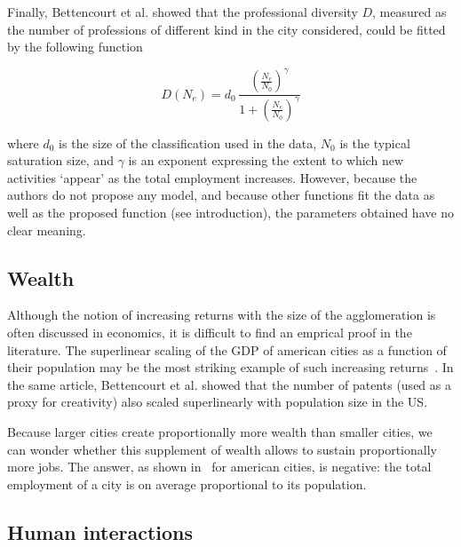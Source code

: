 Finally, Bettencourt et al.\cite{Bettencourt:2014} showed that the professional
diversity $D$, measured as the number of professions of different kind in the
city considered, could be fitted by the following function

\begin{equation}
    D(N_e) = d_0\, \frac{\left(\frac{N_e}{N_0}\right)^\gamma}{1+\left(\frac{N_e}{N_0}\right)^\gamma}
\end{equation}

where $d_0$ is the size of the classification used in the data, $N_0$ is the
typical saturation size, and $\gamma$ is an exponent expressing the extent to
which new activities `appear' as the total employment increases. However,
because the authors do not propose any model, and because other functions fit
the data as well as the proposed function (see introduction), the parameters
obtained have no clear meaning.

\subsection{Wealth}
\label{sub:wealth}

Although the notion of increasing returns with the size of the agglomeration is
often discussed in economics, it is difficult to find an emprical proof in the
literature. The superlinear scaling of the GDP of american cities as a function of
their population may be the most striking example of such increasing
returns~\cite{Bettencourt:2007}. In the same article, Bettencourt et al. showed
that the number of patents (used as a proxy for creativity) also scaled
superlinearly with population size in the US.

Because larger cities create proportionally more wealth than smaller cities, we
can wonder whether this supplement of wealth allows to sustain proportionally
more jobs. The answer, as shown in~\cite{Bettencourt:2014} for american cities,
is negative: the total employment of a city is on average proportional to its population.

\subsection{Human interactions}
\label{sub:human_interactions}

